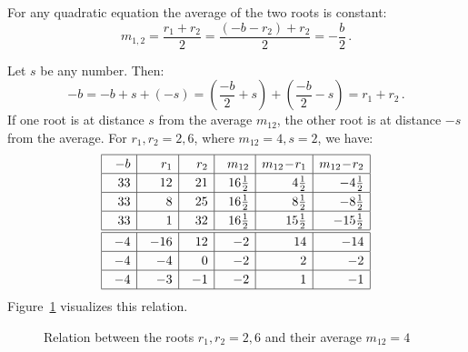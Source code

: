 For any quadratic equation the average of the two roots is constant:
\[
m_{1,2}=\frac{r_1+r_2}{2}=
\frac{(-b-r_2)+r_2}{2}=
-\frac{b}{2}\,.
\]

\newpage

Let $s$ be any number. Then:
\[
-b=-b+s+(-s)=\left(\frac{-b}{2}+s\right) + \left(\frac{-b}{2}-s\right)=r_1+r_2\,.
\]
If one root is at distance $s$ from the average $m_{12}$, the other root is at distance $-s$ from  the average. For $r_1,r_2=2,6$, where $m_{12}=4, s=2$, we have:
\[
\renewcommand{\arraystretch}{1.2}
\begin{array}{|@{\hspace{1em}}r|@{\hspace{1em}}r|@{\hspace{1em}}r|@{\hspace{1em}}r|r|r|}
\hline
-b& r_1 & r_2 & m_{12}& m_{12}\!-\!r_1 & m_{12}\!-\!r_2\\\hline
33 & 12 & 21 & 16\frac{1}{2}&4\frac{1}{2} & -4\frac{1}{2}  \\\hline
33 & 8 & 25 & 16\frac{1}{2}&8\frac{1}{2}&-8\frac{1}{2}\\\hline
33 & 1 & 32 & 16\frac{1}{2}&15\frac{1}{2}&-15\frac{1}{2}\\\hline
\hline
-4 & -16 & 12 & -2 &14& -14\\\hline
-4 & -4 & 0 & -2&2&-2 \\\hline
-4 & -3 & -1 & -2&1&-1 \\\hline
\end{array}
\]
Figure~\ref{f.loh-roots1} visualizes this relation.
\begin{figure}[t]
\begin{center}
\end{center}
\caption{Relation between the roots $r_1,r_2=2,6$ and their average $m_{12}=4$}
\label{f.loh-roots1}
\end{figure}
